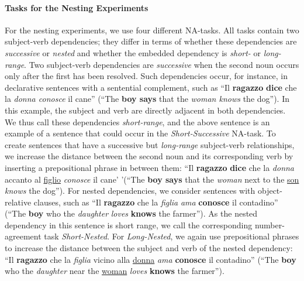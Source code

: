 \paragraph{Tasks for the Nesting Experiments} For the nesting experiments, we use four different NA-tasks. All tasks contain two subject-verb dependencies; they differ in terms of whether these dependencies are \emph{successive} or \emph{nested} and whether the embedded dependency is \emph{short-} or \emph{long-range}. Two subject-verb dependencies are \emph{successive} when the second noun occurs only after the first has been resolved. 
Such dependencies occur, for instance, in declarative sentences with a sentential complement, such as ``Il \textbf{ragazzo} \textbf{dice} che la \textit{donna conosce} il cane'' (``The \textbf{boy says} that the \emph{woman knows} the dog'').
In this example, the subject and verb are directly adjacent in both dependencies.
We thus call these dependencies \emph{short-range}, and the above sentence is an example of a sentence that could occur in the \emph{Short-Successive} NA-task. 
To create sentences that have a successive but \emph{long-range} subject-verb relationships, we increase the distance between the second noun and its corresponding verb by inserting a prepositional phrase in between them: ``Il \textbf{ragazzo} \textbf{dice} che la \textit{donna} accanto al \underline{figlio} \textit{conosce} il cane' '(``The \textbf{boy says} that the \emph{woman} next to the \underline{son} \emph{knows} the dog''). For nested dependencies, we consider sentences with object-relative clauses, such as ``Il \textbf{ragazzo} che la \emph{figlia} \emph{ama} \textbf{conosce} il contadino'' (``The \textbf{boy} who the \emph{daughter} \emph{loves} \textbf{knows} the farmer'').
As the nested dependency in this sentence is short range, we call the corresponding number-agreement task \emph{Short-Nested}.
For \emph{Long-Nested}, we again use prepositional phrases to increase the distance between the subject and verb of the nested dependency: ``Il \textbf{ragazzo} che la \emph{figlia} vicino alla \underline{donna} \emph{ama} \textbf{conosce} il contadino'' (``The \textbf{boy} who the \emph{daughter} near the \underline{woman} \emph{loves} \textbf{knows} the farmer'').

